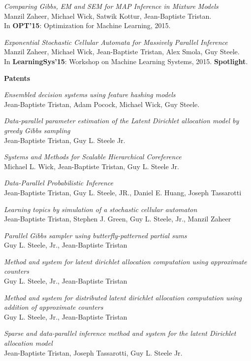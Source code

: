 \documentclass[margin,line]{res}
\begin{document}
\begin{resume}
\emph{Comparing Gibbs, EM and SEM for MAP Inference in Mixture Models}\\
Manzil Zaheer, Michael Wick, Satwik Kottur, Jean-Baptiste Tristan.\\
In {\bf OPT'15}: Optimization for Machine Learning, 2015. 

\emph{Exponential Stochastic Cellular Automata for Massively Parallel Inference}\\
Manzil Zaheer, Michael Wick, Jean-Baptiste Tristan, Alex Smola, Guy Steele.\\
In {\bf LearningSys'15}: Workshop on Machine Learning Systems, 2015. {\bf Spotlight}. 

\newpage
  {\bf {\Large Patents}}

\emph{Ensembled decision systems using feature hashing models}\\
Jean-Baptiste Tristan, Adam Pocock, Michael Wick, Guy Steele.

\emph{Data-parallel parameter estimation of the Latent Dirichlet allocation model by greedy Gibbs sampling}\\
Jean-Baptiste Tristan, Guy L. Steele Jr.

\emph{Systems and Methods for Scalable Hierarchical Coreference}\\
Michael L. Wick, Jean-Baptiste Tristan, Guy L. Steele Jr.

\emph{Data-Parallel Probabilistic Inference}\\
Jean-Baptiste Tristan, Guy L. Steele, JR., Daniel E. Huang, Joseph Tassarotti

\emph{Learning topics by simulation of a stochastic cellular automaton}\\
Jean-Baptiste Tristan, Stephen J. Green, Guy L. Steele, Jr., Manzil Zaheer

\emph{Parallel Gibbs sampler using butterfly-patterned partial sums}\\
Guy L. Steele, Jr., Jean-Baptiste Tristan

\emph{Method and system for latent dirichlet allocation computation using approximate counters}\\
Guy L. Steele, Jr., Jean-Baptiste Tristan

\emph{Method and system for distributed latent dirichlet allocation computation using addition of approximate counters}\\
Guy L. Steele, Jr., Jean-Baptiste Tristan

\emph{Sparse and data-parallel inference method and system for the latent Dirichlet allocation model}\\
Jean-Baptiste Tristan, Joseph Tassarotti, Guy L. Steele Jr.




\end{resume}
\end{document}
